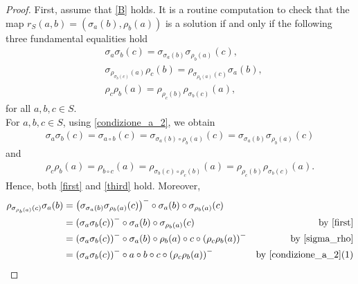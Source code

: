 \documentclass[10pt,a4paper]{amsart}
\begin{document}
\begin{proof}
First, assume that \eqref{B} holds. It is a routine computation to check that the map $r_S(a,b)=(\sigma_a(b), \rho_b(a))$ is a solution if and only if the following three fundamental equalities hold
\begin{align}
     &\label{first} \sigma_a\sigma_b(c)=\sigma_{\sigma_a\left(b\right)}\sigma_{\rho_b\left(a\right)}\left(c\right)\tag{Y1},\\
    &  \label{second}\sigma_{\rho_{\sigma_b\left(c\right)}\left(a\right)}\rho_c\left(b\right)=\rho_{\sigma_{\rho_b\left(a\right)}\left(c\right)}\sigma_a\left(b\right)\tag{Y2},\\
      &\label{third}\rho_c\rho_b(a)=\rho_{\rho_c\left(b\right)}\rho_{\sigma_b\left(c\right)}\left(a\right)\tag{Y3},
  \end{align} 
for all $a,b,c \in S$. \\
For $a, b, c \in S$, using \cref{condizione_a_2}, we obtain 
\begin{align*}
    \sigma_a\sigma_b(c)= \sigma_{a \circ b}(c)=\sigma_{\sigma_a(b)\circ \rho_b(a)}(c)=\sigma_{\sigma_a\left(b\right)}\sigma_{\rho_b\left(a\right)}\left(c\right)
\end{align*}
and
\begin{align*}
    \rho_c\rho_b(a)= \rho_{b \circ c}(a)=\rho_{\sigma_b(c)\circ \rho_c(b)}(a)=\rho_{\rho_c\left(b\right)}\rho_{\sigma_b\left(c\right)}\left(a\right).
\end{align*}
Hence, both \eqref{first} and \eqref{third} hold.
Moreover, 
\begin{align*}
    \rho_{\sigma_{\rho_b(a)}(c)}\sigma_a(b)&=\left(\sigma_{\sigma_a(b)}\sigma_{\rho_b(a)}(c)   \right)^-\circ \sigma_a(b)\circ\sigma_{\rho_b(a)}(c)
    \\&=\left(\sigma_{a}\sigma_b(c)\right)^- \circ \sigma_a(b)\circ \sigma_{\rho_b(a)}(c) &\mbox{by \eqref{first}}\\
    &=\left(\sigma_{a}\sigma_b(c)\right)^- \circ \sigma_a(b)\circ \rho_b(a)\circ c \circ\left(\rho_c\rho_b(a)\right)^-  &\mbox{by \cref{sigma_rho}}\\
    &=\left(\sigma_{a}\sigma_b(c)\right)^- \circ a \circ b \circ c \circ \left(\rho_c\rho_b(a)\right)^-  &\mbox{by \cref{condizione_a_2}(1)}\\

\end{align*}
\end{proof}
\end{document}
